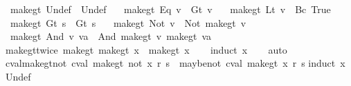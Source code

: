 \begin{isabellebody}
\ \ {\isachardoublequoteopen}make{\isacharunderscore}gt\ Undef\ {\isacharequal}\ Undef{\isachardoublequoteclose}\ {\isacharbar}\isanewline
\ \ {\isachardoublequoteopen}make{\isacharunderscore}gt\ {\isacharparenleft}Eq\ v{\isacharparenright}\ {\isacharequal}\ Gt\ v{\isachardoublequoteclose}\ {\isacharbar}\isanewline
\ \ {\isachardoublequoteopen}make{\isacharunderscore}gt\ {\isacharparenleft}Lt\ v{\isacharparenright}\ {\isacharequal}\ Bc\ True{\isachardoublequoteclose}\ {\isacharbar}\isanewline
\ \ {\isachardoublequoteopen}make{\isacharunderscore}gt\ {\isacharparenleft}Gt\ s{\isacharparenright}\ {\isacharequal}\ Gt\ s{\isachardoublequoteclose}\ {\isacharbar}\isanewline
\ \ {\isachardoublequoteopen}make{\isacharunderscore}gt\ {\isacharparenleft}Not\ v{\isacharparenright}\ {\isacharequal}\ Not\ {\isacharparenleft}make{\isacharunderscore}gt\ v{\isacharparenright}{\isachardoublequoteclose}\ {\isacharbar}\isanewline
\ \ {\isachardoublequoteopen}make{\isacharunderscore}gt\ {\isacharparenleft}And\ v\ va{\isacharparenright}\ {\isacharequal}\ And\ {\isacharparenleft}make{\isacharunderscore}gt\ v{\isacharparenright}\ {\isacharparenleft}make{\isacharunderscore}gt\ va{\isacharparenright}{\isachardoublequoteclose}\isanewline
\isanewline
{}\isamarkupfalse%
\ make{\isacharunderscore}gt{\isacharunderscore}twice{\isacharcolon}\ {\isachardoublequoteopen}make{\isacharunderscore}gt\ {\isacharparenleft}make{\isacharunderscore}gt\ x{\isacharparenright}\ {\isacharequal}\ make{\isacharunderscore}gt\ x{\isachardoublequoteclose}\isanewline
%
\isadelimproof
\ \ %
\endisadelimproof
%
\isatagproof
{}\isamarkupfalse%
\ {\isacharparenleft}induct\ x{\isacharparenright}\isanewline
\ \ \isamarkupfalse%
\ auto%
\endisatagproof
{\isafoldproof}%
%
\isadelimproof
\isanewline
%
\endisadelimproof
\isanewline
{}\isamarkupfalse%
\ cval{\isacharunderscore}make{\isacharunderscore}gt{\isacharunderscore}not{\isacharcolon}\ {\isachardoublequoteopen}cval\ {\isacharparenleft}make{\isacharunderscore}gt\ {\isacharparenleft}not\ x{\isacharparenright}{\isacharparenright}\ r\ s\ {\isacharequal}\ maybe{\isacharunderscore}not\ {\isacharparenleft}cval\ {\isacharparenleft}make{\isacharunderscore}gt\ x{\isacharparenright}\ r\ s{\isacharparenright}{\isachardoublequoteclose}\isanewline
%
\isadelimproof
%
\endisadelimproof
%
\isatagproof
{}\isamarkupfalse%
{\isacharparenleft}induct\ x{\isacharparenright}\isanewline
{}\isamarkupfalse%
\ Undef\isanewline
\ \ \isamarkupfalse%
\ \isamarkupfalse%

\end{isabellebody}

